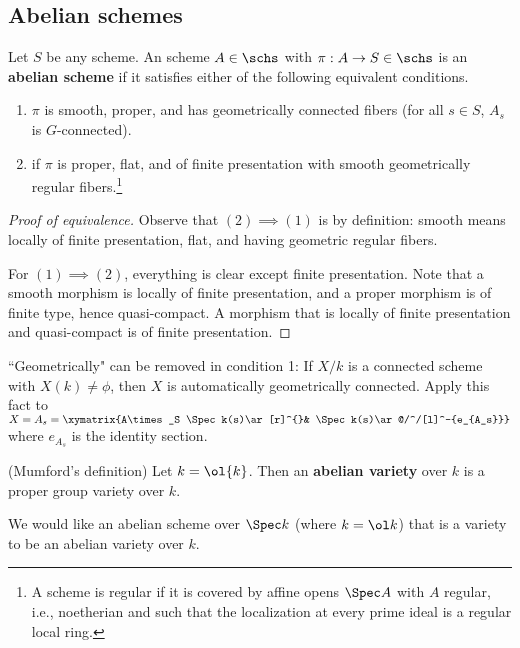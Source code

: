 \subsection{Abelian schemes}
\begin{df}
Let $S$ be any scheme. An scheme $A\in \schs$ with $\pi:A\to S\in \schs$ is an \textbf{abelian scheme} if it satisfies either of the following equivalent conditions.
\begin{enumerate}
\item
$\pi$ is smooth, proper, and has geometrically connected fibers (for all $s\in S$, $A_s$ is $G$-connected). %
\item
if $\pi$ is proper, flat, and of finite presentation with smooth geometrically regular fibers.\footnote{A scheme is regular if it is covered by affine opens $\Spec A$ with $A$ regular, i.e., noetherian and such that the localization at every prime ideal is a regular local ring.}
\end{enumerate}
\end{df}
\begin{proof}[Proof of equivalence]
Observe that $(2)\implies (1)$ is by definition: smooth means locally of finite presentation, flat, and having geometric regular fibers.

For $(1)\implies (2)$, everything is clear except finite presentation. Note that a smooth morphism is locally of finite presentation, and a proper morphism is of finite type, hence quasi-compact. A morphism that is locally of finite presentation and quasi-compact is of finite presentation.
\end{proof}
\begin{rem}
``Geometrically" can be removed in condition 1: If $X/k$  is a connected scheme with $X(k)\ne \phi$, then $X$ is automatically geometrically connected. Apply this fact to $X=A_s=\xymatrix{A\times_S \Spec k(s)\ar[r]^{}& \Spec k(s)\ar@/^/[l]^-{e_{A_s}}}$ where $e_{A_s}$ is the identity section.
\end{rem}%
\begin{df} (Mumford's definition) Let $k=\ol{k}$. Then an \textbf{abelian variety} over $k$ is a proper group variety over $k$. %
\end{df}
We would like an abelian scheme over $\Spec k$ (where $k=\ol k$) that is a variety to be an abelian variety over $k$.
